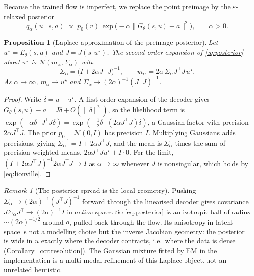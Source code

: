 \documentclass[11pt]{article}
\theoremstyle{plain}
\newtheorem{proposition}[lemma]{Proposition}
\theoremstyle{definition}
\theoremstyle{remark}
\newtheorem{remark}[lemma]{Remark}
\newcommand{\1}{\mathbf 1}
\newcommand{\Gth}{G_\theta}
\newcommand{\Eth}{E_\theta}
\begin{document}
Because the trained flow is imperfect, we replace the point preimage by the
$\varepsilon$-relaxed posterior
\begin{equation}
\label{eq:posterior}
  q_\alpha(u\mid s,a)\;\propto\;p_0(u)\,
  \exp\!\big(-\alpha\|\Gth(s,u)-a\|^2\big),\qquad \alpha>0 .
\end{equation}

\begin{proposition}[Laplace approximation of the preimage posterior]
\label{prop:laplace}
Let $u^\star=\Eth(s,a)$ and $J=J(s,u^\star)$. The second-order expansion of
\eqref{eq:posterior} about $u^\star$ is $\mathcal N(m_\alpha,\Sigma_\alpha)$ with
\begin{equation}
\label{eq:laplace}
  \Sigma_\alpha=\big(I+2\alpha J^\top J\big)^{-1},
  \qquad
  m_\alpha=2\alpha\,\Sigma_\alpha J^\top J\,u^\star .
\end{equation}
As $\alpha\to\infty$, $m_\alpha\to u^\star$ and
$\Sigma_\alpha\to(2\alpha)^{-1}(J^\top J)^{-1}$.
\end{proposition}

\begin{proof}
Write $\delta=u-u^\star$. A first-order expansion of the decoder gives
$\Gth(s,u)-a=J\delta+O(\|\delta\|^2)$, so the likelihood term is
$\exp(-\alpha\delta^\top J^\top J\delta)=\exp(-\tfrac12\delta^\top(2\alpha J^\top J)\delta)$,
a Gaussian factor with precision $2\alpha J^\top J$. The prior $p_0=\mathcal N(0,I)$ has
precision $I$. Multiplying Gaussians adds precisions, giving
$\Sigma_\alpha^{-1}=I+2\alpha J^\top J$, and the mean is $\Sigma_\alpha$ times the sum of
precision-weighted means, $2\alpha J^\top J u^\star+I\cdot 0$. For the limit,
$(I+2\alpha J^\top J)^{-1}2\alpha J^\top J\to I$ as $\alpha\to\infty$ whenever $J$ is
nonsingular, which holds by \eqref{eq:liouville}.
\end{proof}

\begin{remark}[The posterior spread is the local geometry]
\label{rem:laplace-geometry}
Pushing $\Sigma_\alpha\to(2\alpha)^{-1}(J^\top J)^{-1}$ forward through the linearised
decoder gives covariance $J\Sigma_\alpha J^\top\to(2\alpha)^{-1}I$ in \emph{action} space.
So \eqref{eq:posterior} is an isotropic ball of radius $\sim(2\alpha)^{-1/2}$ around $a$,
pulled back through the flow. Its anisotropy in latent space is not a modelling choice but
the inverse Jacobian geometry: the posterior is wide in $u$ exactly where the decoder
contracts, i.e.\ where the data is dense (Corollary~\ref{cor:resolution}). The Gaussian
mixture fitted by EM in the implementation is a multi-modal refinement of this Laplace
object, not an unrelated heuristic.
\end{remark}
\end{document}
